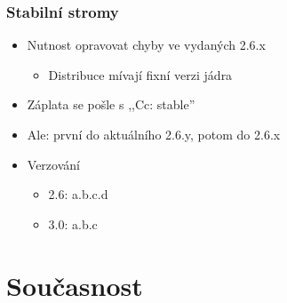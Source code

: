 \documentclass[xcolor=dvipsnames,handout]{beamer}
\begin{document}
\begin{frame}
  \frametitle{Stabilní stromy}

  \begin{itemize}
    \item Nutnost opravovat chyby ve vydaných 2.6.x
    \begin{itemize}
      \item Distribuce mívají fixní verzi jádra
    \end{itemize}

    \pause

    \item Záplata se pošle s ,,Cc: stable''
    \item Ale: první do aktuálního 2.6.y, potom do 2.6.x

    \pause

    \item Verzování
    \begin{itemize}
      \item 2.6: a.b.c.d
      \item 3.0: a.b.c
    \end{itemize}
  \end{itemize}

\end{frame}

\section{Současnost}
\frame{\sectionpage}
\end{document}
